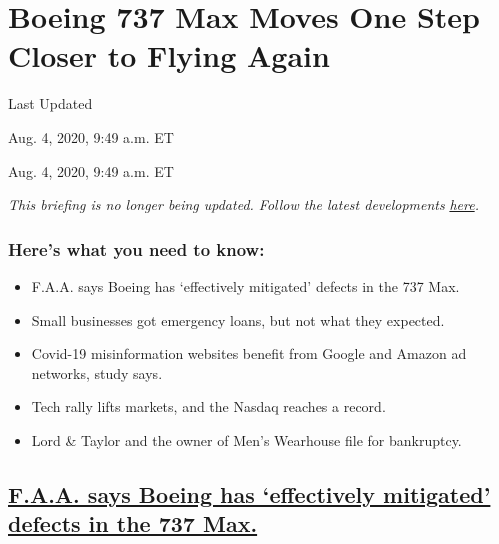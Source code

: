 \hypertarget{boeing-737-max-moves-one-step-closer-to-flying-again}{%
\section{Boeing 737 Max Moves One Step Closer to Flying
Again}\label{boeing-737-max-moves-one-step-closer-to-flying-again}}

Last Updated

Aug. 4, 2020, 9:49 a.m. ET

Aug. 4, 2020, 9:49 a.m. ET

\emph{This briefing is no longer being updated. Follow the latest
developments}
\href{https://www.nytimes3xbfgragh.onion/live/2020/08/04/business/stock-market-today-coronavirus}{\emph{here}}\emph{.}

\hypertarget{heres-what-you-need-to-know}{%
\subsubsection{Here's what you need to
know:}\label{heres-what-you-need-to-know}}

\begin{itemize}
\item
  \protect\hyperlink{faa-says-boeing-has-effectively-mitigated-defects-in-the-737-max}{}

  F.A.A. says Boeing has `effectively mitigated' defects in the 737 Max.
\item
  \protect\hyperlink{small-businesses-got-emergency-loans-but-not-what-they-expected}{}

  Small businesses got emergency loans, but not what they expected.
\item
  \protect\hyperlink{covid-19-misinformation-websites-benefit-from-google-and-amazon-ad-networks-study-says}{}

  Covid-19 misinformation websites benefit from Google and Amazon ad
  networks, study says.
\item
  \protect\hyperlink{tech-rally-lifts-markets-and-the-nasdaq-reaches-a-record}{}

  Tech rally lifts markets, and the Nasdaq reaches a record.
\item
  \protect\hyperlink{lord-taylor-and-the-owner-of-mens-wearhouse-file-for-bankruptcy}{}

  Lord \& Taylor and the owner of Men's Wearhouse file for bankruptcy.
\end{itemize}

\hypertarget{faa-says-boeing-has-effectively-mitigated-defects-in-the-737-max}{%
\subsection{\texorpdfstring{\protect\hyperlink{faa-says-boeing-has-effectively-mitigated-defects-in-the-737-max}{F.A.A.
says Boeing has `effectively mitigated' defects in the 737
Max.}}{F.A.A. says Boeing has `effectively mitigated' defects in the 737 Max.}}\label{faa-says-boeing-has-effectively-mitigated-defects-in-the-737-max}}

